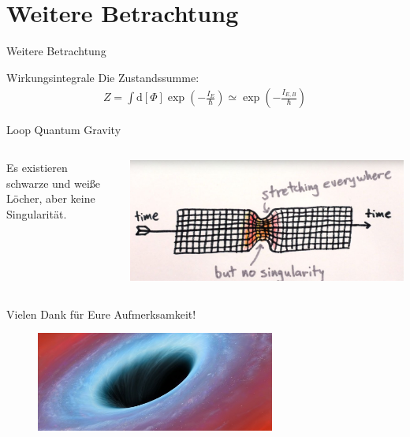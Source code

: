 \documentclass[ngerman,ph]{URbeamer}
\newcommand{\diff}{\mathrm{d}}
\begin{document}
	\section{Weitere Betrachtung}
	\begin{frame}{Weitere Betrachtung}
		\begin{block}{Wirkungsintegrale}
		Die Zustandssumme: 
			\begin{align*}
			Z = \int \diff [\Phi] \exp \left(- \frac{I_E}{\hbar}\right) 
			\simeq \exp \left(- \frac{I_{E,B}}{\hbar}\right)
			\end{align*}
		\end{block}
		\begin{block}{Loop Quantum Gravity}
			\begin{columns}
				\begin{column}[c]{0.45\textwidth}
					Es existieren schwarze und weiße Löcher, aber keine Singularität.
				\end{column}
				\begin{column}[c]{0.45\textwidth}
					\hfill
					\includegraphics[width=\textwidth]{bounce1}
				\end{column} %
			\end{columns}
		\end{block} 
	\end{frame}	
	
	\begin{frame}
		\begin{minipage}[c]{\textwidth}
			\huge{Vielen Dank für Eure Aufmerksamkeit!}
		\end{minipage}	
		\begin{figure} [h] 
			\begin{center}
				\includegraphics[width=0.7\textwidth]{n-117451542-large570}
			\end{center}
		\end{figure}	
	\end{frame}
\end{document}
